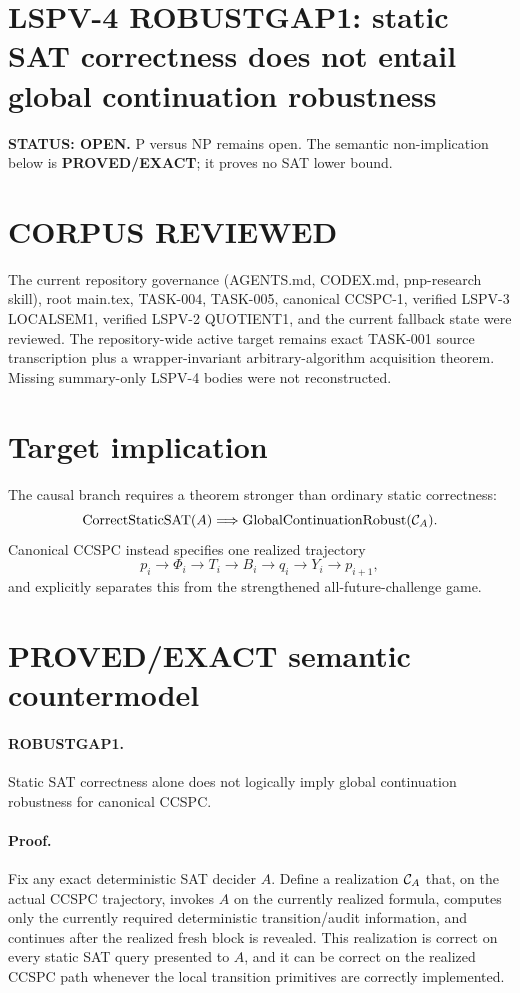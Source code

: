 \documentclass[11pt]{article}
\begin{document}
\section*{LSPV-4 ROBUSTGAP1: static SAT correctness does not entail global continuation robustness}
\textbf{STATUS: OPEN.} P versus NP remains open. The semantic non-implication below is \textbf{PROVED/EXACT}; it proves no SAT lower bound.

\section*{CORPUS REVIEWED}
The current repository governance (AGENTS.md, CODEX.md, pnp-research skill), root main.tex, TASK-004, TASK-005, canonical CCSPC-1, verified LSPV-3 LOCALSEM1, verified LSPV-2 QUOTIENT1, and the current fallback state were reviewed. The repository-wide active target remains exact TASK-001 source transcription plus a wrapper-invariant arbitrary-algorithm acquisition theorem. Missing summary-only LSPV-4 bodies were not reconstructed.

\section*{Target implication}
The causal branch requires a theorem stronger than ordinary static correctness:
\[
\operatorname{CorrectStaticSAT}(A)\Longrightarrow
\operatorname{GlobalContinuationRobust}({\cal C}_A).
\]
Canonical CCSPC instead specifies one realized trajectory
\[
p_i\to\Phi_i\to T_i\to B_i\to q_i\to Y_i\to p_{i+1},
\]
and explicitly separates this from the strengthened all-future-challenge game.

\section*{PROVED/EXACT semantic countermodel}
\paragraph{ROBUSTGAP1.}
Static SAT correctness alone does not logically imply global continuation robustness for canonical CCSPC.

\paragraph{Proof.}
Fix any exact deterministic SAT decider \(A\). Define a realization \({\cal C}_A\) that, on the actual CCSPC trajectory, invokes \(A\) on the currently realized formula, computes only the currently required deterministic transition/audit information, and continues after the realized fresh block is revealed. This realization is correct on every static SAT query presented to \(A\), and it can be correct on the realized CCSPC path whenever the local transition primitives are correctly implemented.
\end{document}
